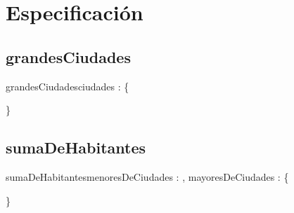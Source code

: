 \documentclass[10pt,a4paper]{article}
\begin{document}
\maketitle

\section{Especificación}

%
%

\subsection{grandesCiudades}

\begin{proc}{grandesCiudades}{\In ciudades : }{\{ } %
    \requiere{\{\True\}}
\end{proc} \} %

\subsection{sumaDeHabitantes}

\begin{proc}{sumaDeHabitantes}{\In menoresDeCiudades : , \In mayoresDeCiudades : }{\{ } 
\end{proc} \} 
\end{document}
